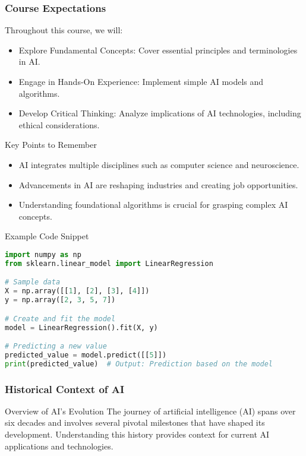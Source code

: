 \documentclass[aspectratio=169]{beamer}
\begin{document}
\begin{frame}[fragile]
    \frametitle{Course Expectations}
    Throughout this course, we will:
    \begin{itemize}
        \item Explore Fundamental Concepts: Cover essential principles and terminologies in AI.
        \item Engage in Hands-On Experience: Implement simple AI models and algorithms.
        \item Develop Critical Thinking: Analyze implications of AI technologies, including ethical considerations.
    \end{itemize}
    
    \begin{block}{Key Points to Remember}
        \begin{itemize}
            \item AI integrates multiple disciplines such as computer science and neuroscience.
            \item Advancements in AI are reshaping industries and creating job opportunities.
            \item Understanding foundational algorithms is crucial for grasping complex AI concepts.
        \end{itemize}
    \end{block}
    
    \begin{block}{Example Code Snippet}
        \begin{lstlisting}[language=Python]
import numpy as np
from sklearn.linear_model import LinearRegression

# Sample data
X = np.array([[1], [2], [3], [4]])
y = np.array([2, 3, 5, 7])

# Create and fit the model
model = LinearRegression().fit(X, y)

# Predicting a new value
predicted_value = model.predict([[5]])
print(predicted_value)  # Output: Prediction based on the model
        \end{lstlisting}
    \end{block}
\end{frame}

\begin{frame}[fragile]
    \frametitle{Historical Context of AI}
    \begin{block}{Overview of AI's Evolution}
        The journey of artificial intelligence (AI) spans over six decades and involves several pivotal milestones that have shaped its development. Understanding this history provides context for current AI applications and technologies.
    \end{block}
\end{frame}
\end{document}
